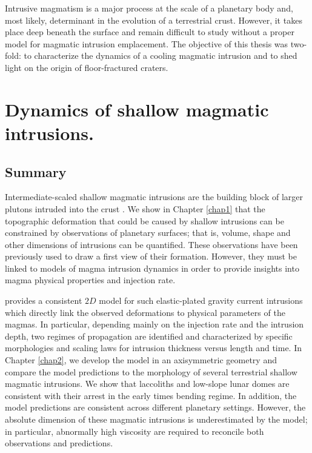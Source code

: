 Intrusive magmatism  is a major  process at  the scale of  a planetary
body and, most  likely, determinant in the evolution  of a terrestrial
crust. However,  it takes  place deep beneath  the surface  and remain
difficult  to study  without  a proper  model  for magmatic  intrusion
emplacement.  The objective of this thesis was two-fold: to characterize the
dynamics of  a cooling  magmatic intrusion  and to  shed light  on the
origin of floor-fractured craters. 

\section*{Dynamics of shallow magmatic intrusions.}

\subsection*{Summary}
\label{sec:summary}

Intermediate-scaled shallow magmatic intrusions are the building block
of      larger      plutons      intruded     into      the      crust
\citep{Petford:2000cc,Glazner:2004gv}.  We show in Chapter \ref{chap1}
that  the topographic  deformation  that could  be  caused by  shallow
intrusions can  be constrained by observations  of planetary surfaces;
that  is, volume,  shape and  other  dimensions of  intrusions can  be
quantified. These  observations have  been previously  used to  draw a
first view of their formation.  However, they must be linked to models
of magma  intrusion dynamics in  order to provide insights  into magma
physical properties and injection rate.

\citet{Michaut:2011kg}  provides  a  consistent $2D$  model  for  such
elastic-plated  gravity current  intrusions  which  directly link  the
observed  deformations  to  physical  parameters of  the  magmas.   In
particular, depending mainly  on the injection rate  and the intrusion
depth, two regimes of propagation  are identified and characterized by
specific morphologies and scaling  laws for intrusion thickness versus
length and time.   In Chapter \ref{chap2}, we develop the  model in an
axisymmetric  geometry  and  compare  the  model  predictions  to  the
morphology  of several  terrestrial shallow  magmatic intrusions.   We
show that  laccoliths and  low-slope lunar  domes are  consistent with
their arrest in the early times bending regime. In addition, the model
predictions    are     consistent    across     different    planetary
settings. However, the absolute dimension of these magmatic intrusions
is  underestimated  by  the  model;  in  particular,  abnormally  high
viscosity are required to reconcile both observations and predictions.

